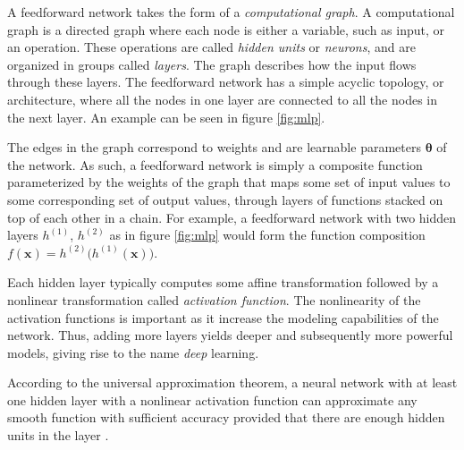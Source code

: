 \documentclass{kththesis}
\newcommand{\vx}{\boldsymbol{x}}
\newcommand{\vth}{\boldsymbol{\theta}}
\begin{document}
A feedforward network takes the form of a \textit{computational graph}. A computational graph is a directed graph where each node is either a variable, such as input, or an operation. These operations are called \emph{hidden units} or \emph{neurons}, and are organized in groups called \emph{layers}. The graph describes how the input flows through these layers.
The feedforward network has a simple acyclic topology, or architecture, where all the nodes in one layer are connected to all the nodes in the next layer. An example can be seen in figure \ref{fig:mlp}.

The edges in the graph correspond to weights and are learnable parameters $\vth$ of the network. As such, a feedforward network is simply a composite function parameterized by the weights of the graph that maps some set of input values to some corresponding set of output values, through layers of functions stacked on top of each other in a chain. For example, a feedforward network with two hidden layers $h^{(1)}$, $h^{(2)}$ as in figure \ref{fig:mlp} would form the function composition $f(\vx) = h^{(2)}\big(h^{(1)}(\vx)\big)$.

Each hidden layer typically computes some affine transformation followed by a nonlinear transformation called \textit{activation function}. The nonlinearity of the activation functions is important as it increase the modeling capabilities of the network. Thus, adding more layers yields deeper and subsequently more powerful models, giving rise to the name \emph{deep} learning.

According to the universal approximation theorem, a neural network with at least one hidden layer with a nonlinear activation function can approximate any smooth function with sufficient accuracy provided that there are enough hidden units in the layer \parencite{Hornik1989} \parencite{Cybenko1989}.
\end{document}
